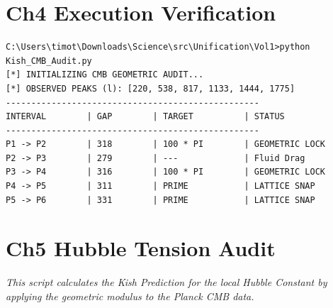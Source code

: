 \documentclass[11pt, letterpaper, openany]{book}
\begin{document}
\chapter{Ch4 Execution Verification}
\begin{lstlisting}[style=terminal, caption={Terminal Output: Kish\_CMB\_Audit.py}]
C:\Users\timot\Downloads\Science\src\Unification\Vol1>python Kish_CMB_Audit.py
[*] INITIALIZING CMB GEOMETRIC AUDIT...
[*] OBSERVED PEAKS (l): [220, 538, 817, 1133, 1444, 1775]
--------------------------------------------------
INTERVAL        | GAP        | TARGET          | STATUS
--------------------------------------------------
P1 -> P2        | 318        | 100 * PI        | GEOMETRIC LOCK
P2 -> P3        | 279        | ---             | Fluid Drag
P3 -> P4        | 316        | 100 * PI        | GEOMETRIC LOCK
P4 -> P5        | 311        | PRIME           | LATTICE SNAP
P5 -> P6        | 331        | PRIME           | LATTICE SNAP
\end{lstlisting}

\chapter{Ch5 Hubble Tension Audit}
\textit{This script calculates the Kish Prediction for the local Hubble Constant by applying the geometric modulus to the Planck CMB data.}
\end{document}

